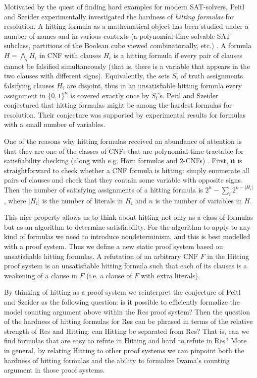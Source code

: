 \documentclass[11pt]{article}
\newcommand{\scterm}[1]{{\textrm{\sc #1}}}
\newcommand{\hit}{\scterm{Hitting}}
\newcommand{\res}{\scterm{Res}}
\numberwithin{equation}{section}
\begin{document}
Motivated by the quest of finding hard examples for modern SAT-solvers, Peitl and Szeider \cite{PS22} experimentally investigated the hardness of \emph{hitting formulas} for resolution. A hitting formula as a mathematical object has been studied under a number of names and in various contexts (a polynomial-time solvable SAT subclass, partitions of the Boolean cube viewed combinatorially, etc.) \cite{Iwa89, DavDav98, Kul04,Kul07,GwynneKullman13, Gwynne,KullmannZhao13,PS22,ourcombpaper}.
A formula $H = \bigwedge_i H_i$ in CNF with clauses $H_i$ is a hitting formula if every pair of clauses cannot be falsified simultaneously (that is, there is a variable that appears in the two clauses with different signs). Equivalently, the sets $S_i$ of truth assignments falsifying clauses $H_i$ are disjoint, thus in an unsatisfiable hitting formula every assignment in $\{0,1\}^n$ is covered exactly once by $S_i$'s. Peitl and Szeider conjectured that hitting formulas might be among the hardest formulas for resolution. Their conjecture was supported by experimental results for formulas with a small number of variables.

One of the reasons why hitting formulas received an abundance of attention is that they are one of the classes of CNFs that are polynomial-time tractable for satisfiability checking (along with e.g. Horn formulas and 2-CNFs) \cite{Iwa89}. First, it is straightforward to check whether a CNF formula is hitting: simply enumerate all pairs of clauses and check that they contain some variable with opposite signs. Then the number of satisfying assignments of a hitting formula is $2^n - \sum_i 2^{n-|H_i|}$, where $|H_i|$ is the number of literals in $H_i$ and $n$ is the number of variables in $H$.

This nice property allows us to think about hitting not only as a class of formulas but as an algorithm to determine satisfiability. For the algorithm to apply to any kind of formulas we need to introduce nondeterminism, and this is best modelled with a proof system. Thus we define a new static proof system based on unsatisfiable hitting formulas.
A refutation of an arbitrary CNF $F$ in the {\hit} proof system is an unsatisfiable hitting formula such that each of its clauses is a weakening of a clause in $F$ (i.e. a clause of $F$ with extra literals).

By thinking of hitting as a proof system we reinterpret the conjecture of Peitl and Szeider as the following question: is it possible to efficiently formalize the model counting argument above within the {\res} proof system?
Then the question of the hardness of hitting formulas for {\res} can be phrased in terms of the relative strength of {\res} and {\hit}: can {\hit} be separated from {\res}? That is, can we find formulas that are easy to refute in {\hit} and hard to refute in {\res}? More in general, by relating {\hit} to other proof systems we can pinpoint both the hardness of hitting formulas and the ability to formalize Iwama's counting argument in those proof systems.
\end{document}
